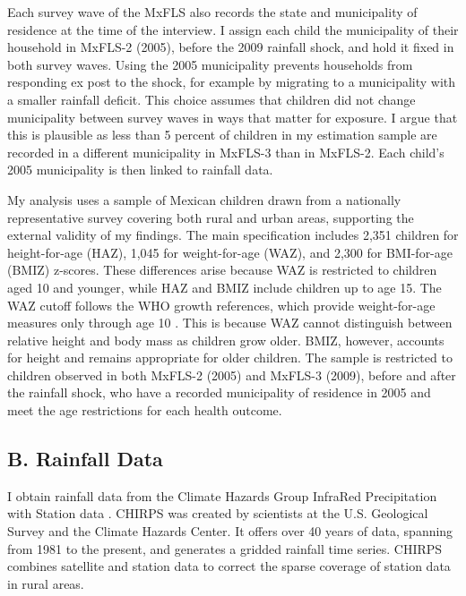 Each survey wave of the MxFLS also records the state and municipality of residence at the time of the interview. I assign each child the municipality of their household in MxFLS-2 (2005), before the 2009 rainfall shock, and hold it fixed in both survey waves. Using the 2005 municipality prevents households from responding ex post to the shock, for example by migrating to a municipality with a smaller rainfall deficit. This choice assumes that children did not change municipality between survey waves in ways that matter for exposure. I argue that this is plausible as less than 5 percent of children in my estimation sample are recorded in a different municipality in MxFLS-3 than in MxFLS-2. Each child's 2005 municipality is then linked to rainfall data.

My analysis uses a sample of Mexican children drawn from a nationally representative survey covering both rural and urban areas, supporting the external validity of my findings. The main specification includes 2,351 children for height-for-age (HAZ), 1,045 for weight-for-age (WAZ), and 2,300 for BMI-for-age (BMIZ) z-scores. These differences arise because WAZ is restricted to children aged 10 and younger, while HAZ and BMIZ include children up to age 15. The WAZ cutoff follows the WHO growth references, which provide weight-for-age measures only through age 10 \parencite{deonisDevelopmentWHOGrowth2007}. This is because WAZ cannot distinguish between relative height and body mass as children grow older. BMIZ, however, accounts for height and remains appropriate for older children. The sample is restricted to children observed in both MxFLS-2 (2005) and MxFLS-3 (2009), before and after the rainfall shock, who have a recorded municipality of residence in 2005 and meet the age restrictions for each health outcome.

\subsection*{B. Rainfall Data}

I obtain rainfall data from the Climate Hazards Group InfraRed Precipitation with Station data \parencite[CHIRPS;][]{funkClimateHazardsInfrared2015}. CHIRPS was created by scientists at the U.S. Geological Survey and the Climate Hazards Center. It offers over 40 years of data, spanning from 1981 to the present, and generates a gridded rainfall time series. CHIRPS combines satellite and station data to correct the sparse coverage of station data in rural areas.

